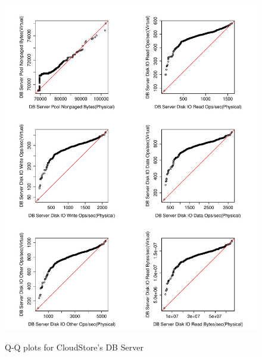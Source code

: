 \begin{figure}[tbh]
	\centering
	{\includegraphics[width=1.0\textwidth]{figures/appendix/qq_plots/CloudStore/DB_Server/Third_six.pdf}}
	\caption{Q-Q plots for CloudStore's DB Server}
\end{figure}


